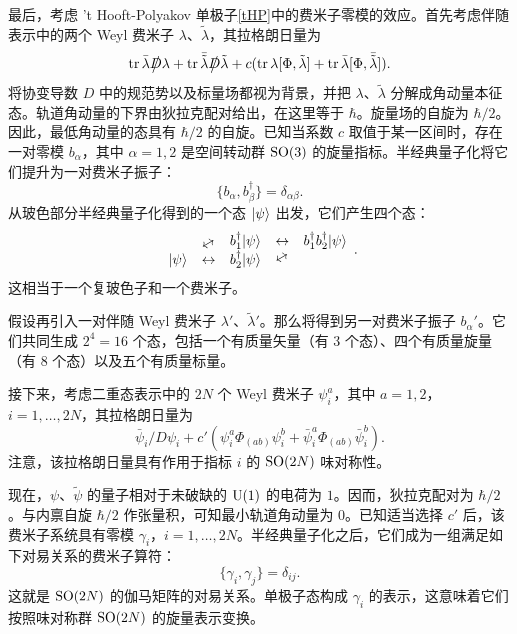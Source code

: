 最后，考虑 't Hooft-Polyakov 单极子\eqref{tHP}中的费米子零模的效应。首先考虑伴随表示中的两个 Weyl 费米子 $\lambda$、$\tilde\lambda$，其拉格朗日量为
\begin{equation}
\tr \bar\lambda \slash D \lambda + \tr\bar{\tilde\lambda} \slash D \tilde\lambda
+ c(\tr  \lambda [\Phi,  \tilde\lambda ] + \tr \bar \lambda [\Phi,\bar{\tilde\lambda}]).
\end{equation}
将协变导数 $D$ 中的规范势以及标量场都视为背景，并把 $\lambda$、$\tilde\lambda$ 分解成角动量本征态。轨道角动量的下界由狄拉克配对给出，在这里等于 $\hbar$。旋量场的自旋为 $\hbar/2$。因此，最低角动量的态具有 $\hbar/2$ 的自旋。已知当系数 $c$ 取值于某一区间时，存在一对零模 $b_\alpha$，其中 $\alpha=1,2$ 是空间转动群 $\mathop{\mathrm{SO}}(3)$ 的旋量指标。半经典量子化将它们提升为一对费米子振子：
\begin{equation}
\{b_\alpha,b_\beta^\dagger\}=\delta_{\alpha\beta}.
\end{equation}
从玻色部分半经典量子化得到的一个态 $|\psi\rangle$ 出发，它们产生四个态：
\begin{equation}
\begin{array}{ccccc}
&\raisebox{-.8ex}{\rotatebox{30}{$\leftrightarrow$}}& b^\dagger_1 \ket\psi & \leftrightarrow & b^\dagger_1 b^\dagger_2 \ket\psi \\
\ket\psi & \leftrightarrow & b^\dagger_2\ket\psi & \rotatebox{30}{$\leftrightarrow$}
\end{array}.
\end{equation}
这相当于一个复玻色子和一个费米子。

假设再引入一对伴随 Weyl 费米子 $\lambda'$、$\tilde\lambda'$。那么将得到另一对费米子振子 $b_\alpha'$。它们共同生成 $2^4=16$ 个态，包括一个有质量矢量（有 3 个态）、四个有质量旋量（有 8 个态）以及五个有质量标量。

接下来，考虑二重态表示中的 $2N$ 个 Weyl 费米子 $\psi_i^a$，其中 $a=1,2$，$i=1,\ldots,2N$，其拉格朗日量为
\begin{equation}
 \bar\psi_i \slash D \psi_i
+ c'  (\psi^a_i \Phi_{(ab)}  \psi^b_i +\bar\psi^a_i \Phi_{(ab)}  \bar\psi^b_i ).
\end{equation}
注意，该拉格朗日量具有作用于指标 $i$ 的 $\mathop{\mathrm{SO}}(2N)$ 味对称性。

现在，$\psi$、$\tilde\psi$ 的量子相对于未破缺的 ${\mathrm{U}}(1)$ 的电荷为 $1$。因而，狄拉克配对为 $\hbar/2$。与内禀自旋 $\hbar/2$ 作张量积，可知最小轨道角动量为 $0$。已知适当选择 $c'$ 后，该费米子系统具有零模 $\gamma_i$，$i=1,\ldots,2N$。半经典量子化之后，它们成为一组满足如下对易关系的费米子算符：
\begin{equation}
\{\gamma_i,\gamma_j\}=\delta_{ij}.
\end{equation}
这就是 $\mathop{\mathrm{SO}}(2N)$ 的伽马矩阵的对易关系。单极子态构成 $\gamma_i$ 的表示，这意味着它们按照味对称群 $\mathop{\mathrm{SO}}(2N)$ 的旋量表示变换。

